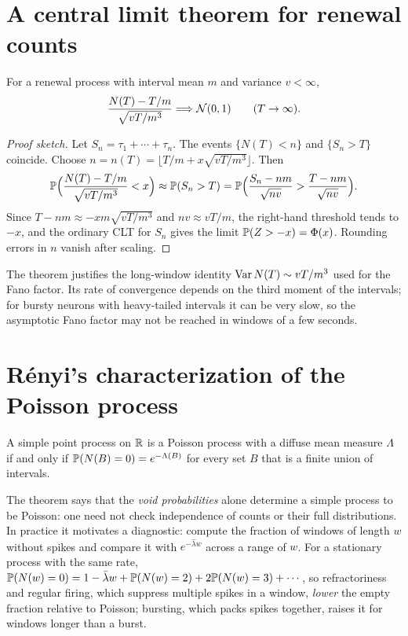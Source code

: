 \section{A central limit theorem for renewal counts}
\begin{theorem}
For a renewal process with interval mean $m$ and variance $v<\infty$,
\[
\frac{N(T)-T/m}{\sqrt{vT/m^3}}\Longrightarrow\mathcal{N}(0,1)\qquad(T\to\infty).
\]
\end{theorem}
\begin{proof}[Proof sketch]
Let $S_n=\tau_1+\cdots+\tau_n$. The events $\{N(T)<n\}$ and
$\{S_n>T\}$ coincide. Choose $n=n(T)=\lfloor T/m+x\sqrt{vT/m^3}\rfloor$.
Then
\[
\mathbb{P}\Bigl(\frac{N(T)-T/m}{\sqrt{vT/m^3}}<x\Bigr)\approx\mathbb{P}(S_n>T)
=\mathbb{P}\Bigl(\frac{S_n-nm}{\sqrt{nv}}>\frac{T-nm}{\sqrt{nv}}\Bigr).
\]
Since $T-nm\approx-xm\sqrt{vT/m^3}$ and $nv\approx vT/m$, the right-hand
threshold tends to $-x$, and the ordinary CLT for $S_n$ gives the limit
$\mathbb{P}(Z>-x)=\Phi(x)$. Rounding errors in $n$ vanish after scaling.
\end{proof}
The theorem justifies the long-window identity $\operatorname{Var} N(T)\sim vT/m^3$
used for the Fano factor. Its rate of convergence depends on the third
moment of the intervals; for bursty neurons with heavy-tailed intervals
it can be very slow, so the asymptotic Fano factor may not be reached in
windows of a few seconds.

\section{R\'enyi's characterization of the Poisson process}
\begin{theorem}[R\'enyi]
A simple point process on $\mathbb{R}$ is a Poisson process with a diffuse mean
measure $\Lambda$ if and only if $\mathbb{P}(N(B)=0)=e^{-\Lambda(B)}$ for every
set $B$ that is a finite union of intervals.
\end{theorem}
The theorem says that the \emph{void probabilities} alone determine a
simple process to be Poisson: one need not check independence of counts
or their full distributions. In practice it motivates a diagnostic:
compute the fraction of windows of length $w$ without spikes and compare
it with $e^{-\hat\lambda w}$ across a range of $w$. For a stationary process with the same rate,
$\mathbb{P}(N(w)=0)=1-\bar\lambda w+\mathbb{P}(N(w)=2)+2\mathbb{P}(N(w)=3)+\cdots$, so
refractoriness and regular firing, which suppress multiple spikes in a
window, \emph{lower} the empty fraction relative to Poisson; bursting,
which packs spikes together, raises it for windows longer than a burst.

